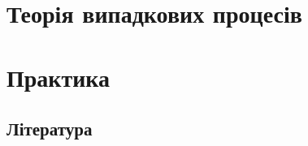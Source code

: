 \documentclass[a5paper,12pt,oneside,ukrainian]{book}
\begin{document}
\tableofcontents
{}
\chapter{Теорія випадкових процесів}













\chapter{Практика}





\section{Література}
\end{document}
